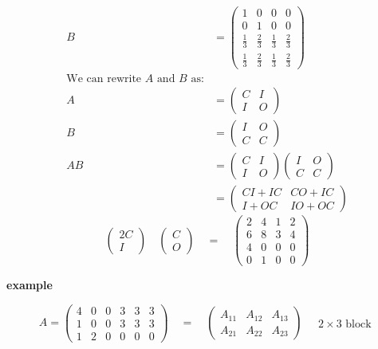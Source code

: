 \begin{align*}
B &= \begin{pmatrix}
1 & 0 & 0 & 0 \\
0 & 1 & 0 & 0 \\
\frac{1}{3} & \frac{2}{3} & \frac{1}{3} & \frac{2}{3} \\
\frac{1}{3} & \frac{2}{3} & \frac{1}{3} & \frac{2}{3}
\end{pmatrix} \\[10pt]
\text{We can rewrite } A \text{ and } B \text{ as:} \\[10pt]
A &= \begin{pmatrix}
C & I \\
I & O
\end{pmatrix} \\[10pt]
B &= \begin{pmatrix}
I & O \\
C & C
\end{pmatrix} \\[10pt]
AB &= \begin{pmatrix}
C & I \\
I & O
\end{pmatrix}
\begin{pmatrix}
I & O \\
C & C
\end{pmatrix} \\[10pt]
&= \begin{pmatrix}
CI + IC & CO + IC \\
I + OC & IO + OC
\end{pmatrix}
\end{align*}\begin{equation*}
\begin{pmatrix}
2C \\
I
\end{pmatrix}
\quad
\begin{pmatrix}
C \\
O
\end{pmatrix}
\quad = \quad
\begin{pmatrix}
2 & 4 & 1 & 2 \\
6 & 8 & 3 & 4 \\
4 & 0 & 0 & 0 \\
0 & 1 & 0 & 0
\end{pmatrix}
\end{equation*}

\textbf{example}

\begin{equation*}
A = 
\begin{pmatrix}
4 & 0 & 0 & 3 & 3 & 3 \\
1 & 0 & 0 & 3 & 3 & 3 \\
1 & 2 & 0 & 0 & 0 & 0
\end{pmatrix}
\quad = \quad
\begin{pmatrix}
A_{11} & A_{12} & A_{13} \\
A_{21} & A_{22} & A_{23}
\end{pmatrix}
\quad
\begin{matrix}
2 \times 3 \text{ block}
\end{matrix}
\end{equation*}

